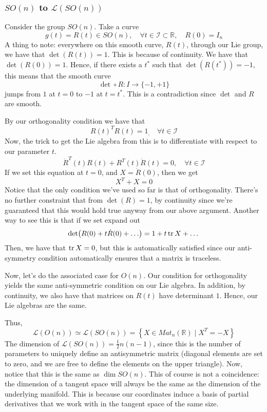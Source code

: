 \documentclass[11pt, oneside]{article}   	%
\theoremstyle{slanted}
\begin{document}
\subsubsection{$ SO ( n ) $ to $ \mathcal{ L } ( SO ( n ) ) $} 
Consider the group $ SO ( n ) $. Take a curve 
\[
g ( t)  = R( t) \in SO ( n ), \quad \forall t \in \mathcal{ I } \subset \mathbb{ R}, \quad  R ( 0 ) = I_n
\] A thing to note: everywhere on this smooth curve, $R( t) $, through 
our Lie group, we have that $ \det (R( t) )  = 1$. This is because of continuity.
We have that  $ \det ( R ( 0 ) )  = 1$. Hence, if there
exists a  $ t^ * $ such that  $  \det ( R( t^ * ) ) = - 1$, this means that the 
smooth curve
 \[
 \det \circ R : I \rightarrow \{ -1 , + 1 \} 
\] jumps from $ 1 $ at $ t = 0  $  to $ -1 $ at $ t = t ^ * $. 
This is a contradiction since  $ \det  $ and $ R $ are smooth. 

By our orthogonality condition we have that
\[
R ( t) ^ T R( t)  = 1_, \quad \forall t \in \mathcal{ I }
\] Now, the trick to get the Lie algebra from this is
to differentiate with respect to our parameter $ t$. 
\[
\dot { R} ^ T ( t) R( t) + R^ T ( t) \dot{ R} ( t)  =0, \quad  \forall t \in \mathcal{ I }
\] If we set this equation at $ t = 0 $, and $ X = \dot{ R} ( 0 )  $, then we get
\[
X^ T + X = 0 
\] Notice that the only condition 
we've used so far is that of orthogonality. There's no further constraint that from $ \det ( R) = 1$, 
by continuity since we're guaranteed that this would hold true anyway from our above argument. 
Another way to see this is that if we set expand out 
\[
	\det ( R( 0) + t \dot{ R  } ( 0 ) + \dots )  = 1 + t  \tr X  + \dots 
\] Then, we have that $ \tr X  = 0 $, but this is automatically 
satisfied since our anti-symmetry condition automatically ensures 
that a matrix is traceless. 

Now, let's do the associated case for $ O ( n ) $. 
Our condition for orthogonality yields 
the same anti-symmetric condition on our Lie algebra. In addition, 
by continuity, we also have that matrices on  $ R ( t) $ have determinant $ 1 $. 
Hence, our Lie algebras are the same. 

Thus, 
\[
	\mathcal{ L } ( O ( n ) ) \simeq \mathcal{L }( SO ( n ) )  = \left\{ X \in Mat_n ( \mathbb{ R} ) \mid X^T =  - X \right\} 
\] The dimension of $ \mathcal{ L } ( SO ( n ) )  = \frac{1}{2 } n ( n - 1) 	$, since this is the number of parameters to uniquely define an antisymmetric matrix (diagonal elements are set to zero, and we are free to define the elements on the upper triangle). Now, notice that this is the 
same as $ \dim SO ( n ) $. This of course is not a coincidence: the dimension of a tangent space will
always be the same as the dimension of the underlying manifold. 
This is because our coordinates induce a basis of partial derivatives
that we work with in the tangent space of the same size. 
\end{document}
